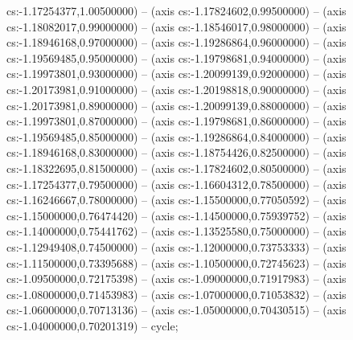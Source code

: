 cs:-1.17254377,1.00500000) -- (axis cs:-1.17824602,0.99500000) -- (axis cs:-1.18082017,0.99000000) -- (axis cs:-1.18546017,0.98000000) -- (axis cs:-1.18946168,0.97000000) -- (axis cs:-1.19286864,0.96000000) -- (axis cs:-1.19569485,0.95000000) -- (axis cs:-1.19798681,0.94000000) -- (axis cs:-1.19973801,0.93000000) -- (axis cs:-1.20099139,0.92000000) -- (axis cs:-1.20173981,0.91000000) -- (axis cs:-1.20198818,0.90000000) -- (axis cs:-1.20173981,0.89000000) -- (axis cs:-1.20099139,0.88000000) -- (axis cs:-1.19973801,0.87000000) -- (axis cs:-1.19798681,0.86000000) -- (axis cs:-1.19569485,0.85000000) -- (axis cs:-1.19286864,0.84000000) -- (axis cs:-1.18946168,0.83000000) -- (axis cs:-1.18754426,0.82500000) -- (axis cs:-1.18322695,0.81500000) -- (axis cs:-1.17824602,0.80500000) -- (axis cs:-1.17254377,0.79500000) -- (axis cs:-1.16604312,0.78500000) -- (axis cs:-1.16246667,0.78000000) -- (axis cs:-1.15500000,0.77050592) -- (axis cs:-1.15000000,0.76474420) -- (axis cs:-1.14500000,0.75939752) -- (axis cs:-1.14000000,0.75441762) -- (axis cs:-1.13525580,0.75000000) -- (axis cs:-1.12949408,0.74500000) -- (axis cs:-1.12000000,0.73753333) -- (axis cs:-1.11500000,0.73395688) -- (axis cs:-1.10500000,0.72745623) -- (axis cs:-1.09500000,0.72175398) -- (axis cs:-1.09000000,0.71917983) -- (axis cs:-1.08000000,0.71453983) -- (axis cs:-1.07000000,0.71053832) -- (axis cs:-1.06000000,0.70713136) -- (axis cs:-1.05000000,0.70430515) -- (axis cs:-1.04000000,0.70201319) -- cycle;
